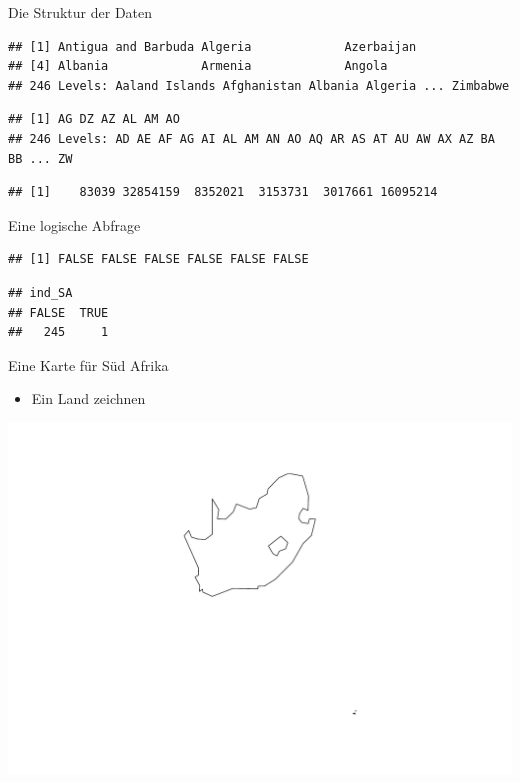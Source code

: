 \documentclass[ignorenonframetext,]{beamer}
\providecommand{\tightlist}{%
  \setlength{\itemsep}{0pt}\setlength{\parskip}{0pt}}
\begin{document}
\begin{frame}[fragile]{Die Struktur der Daten}

\begin{verbatim}
## [1] Antigua and Barbuda Algeria             Azerbaijan         
## [4] Albania             Armenia             Angola             
## 246 Levels: Aaland Islands Afghanistan Albania Algeria ... Zimbabwe
\end{verbatim}

\begin{verbatim}
## [1] AG DZ AZ AL AM AO
## 246 Levels: AD AE AF AG AI AL AM AN AO AQ AR AS AT AU AW AX AZ BA BB ... ZW
\end{verbatim}

\begin{verbatim}
## [1]    83039 32854159  8352021  3153731  3017661 16095214
\end{verbatim}

\end{frame}

\begin{frame}[fragile]{Eine logische Abfrage}

\begin{verbatim}
## [1] FALSE FALSE FALSE FALSE FALSE FALSE
\end{verbatim}

\begin{verbatim}
## ind_SA
## FALSE  TRUE 
##   245     1
\end{verbatim}

\end{frame}

\begin{frame}{Eine Karte für Süd Afrika}

\begin{itemize}
\tightlist
\item
  Ein Land zeichnen
\end{itemize}

\includegraphics{Geomedizin_files/figure-beamer/unnamed-chunk-92-1.pdf}

\end{frame}
\end{document}
